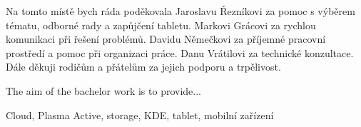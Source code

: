 \documentclass[12pt,oneside,draft]{fithesis2}
\begin{document}
  
\FrontMatter  
\ThesisTitlePage  
 
\begin{ThesisDeclaration}  
\DeclarationText  
\AdvisorName  
\end{ThesisDeclaration}  
 
\begin{ThesisThanks}  
Na tomto místě bych ráda poděkovala Jaroslavu Řezníkovi za pomoc s výběrem tématu, odborné rady a zapůjčení tabletu. Markovi Grácovi za rychlou komunikaci při řešení problémů. Davidu Němečkovi za příjemné pracovní prostředí a pomoc při organizaci práce. Danu Vrátilovi za technické konzultace. Dále děkuji rodičům a přátelům za jejich podporu a trpělivost.  
\end{ThesisThanks}  
 
\begin{ThesisAbstract}  
The aim of the bachelor work is to provide...  
\end{ThesisAbstract}  
 
\begin{ThesisKeyWords}  
Cloud, Plasma Active, storage, KDE, tablet, mobilní zařízení
\end{ThesisKeyWords}  
 
\MainMatter  
\tableofcontents          %
\listoftodos %
 









 
 
\end{document}
